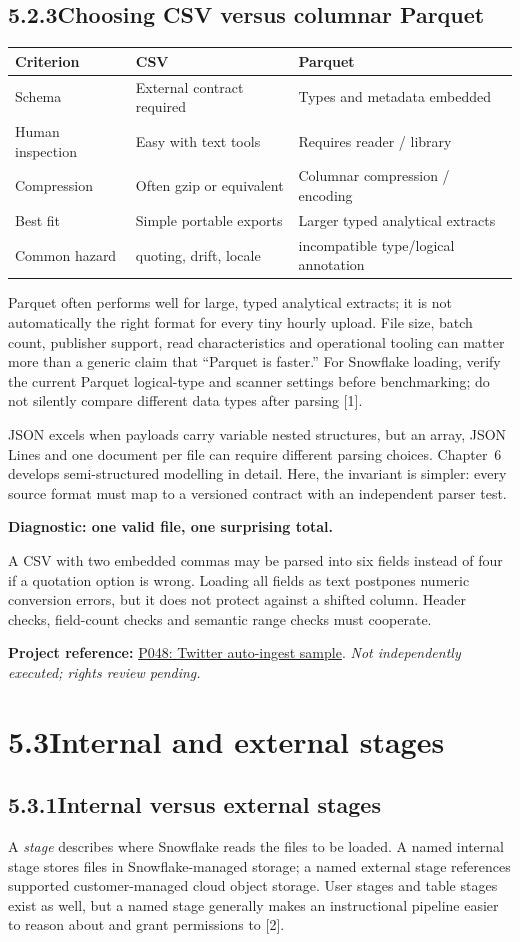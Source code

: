 \documentclass[11pt,twoside]{article}
\newcommand{\topic}[2]{\subsection*{#1\quad #2}}
\newcommand{\repo}[2]{\par\begingroup\fontsize{8.0}{9.6}\selectfont\sffamily\color{inkgray}\textbf{Project reference:} \href{#2}{#1}. \textit{Not independently executed; rights review pending.}\par\endgroup}
\begin{document}
\topic{5.2.3}{Choosing CSV versus columnar Parquet}
\begin{center}\small\begin{tabularx}{\linewidth}{@{}p{25mm}X X@{}}\toprule
Criterion & CSV & Parquet\\\midrule
Schema & External contract required & Types and metadata embedded\\
Human inspection & Easy with text tools & Requires reader / library\\
Compression & Often gzip or equivalent & Columnar compression / encoding\\
Best fit & Simple portable exports & Larger typed analytical extracts\\
Common hazard & quoting, drift, locale & incompatible type/logical annotation\\\bottomrule\end{tabularx}\end{center}
Parquet often performs well for large, typed analytical extracts; it is not automatically the right format for every tiny hourly upload. File size, batch count, publisher support, read characteristics and operational tooling can matter more than a generic claim that ``Parquet is faster.'' For Snowflake loading, verify the current Parquet logical-type and scanner settings before benchmarking; do not silently compare different data types after parsing [1].

JSON excels when payloads carry variable nested structures, but an array, JSON Lines and one document per file can require different parsing choices. Chapter~6 develops semi-structured modelling in detail. Here, the invariant is simpler: every source format must map to a versioned contract with an independent parser test.

\begin{insight}\textbf{Diagnostic: one valid file, one surprising total.}\par
A CSV with two embedded commas may be parsed into six fields instead of four if a quotation option is wrong. Loading all fields as text postpones numeric conversion errors, but it does not protect against a shifted column. Header checks, field-count checks and semantic range checks must cooperate.\end{insight}
\repo{P048: Twitter auto-ingest sample}{https://github.com/Snowflake-Labs/sfguide-twitter-auto-ingest}
\newpage
\section*{5.3\quad Internal and external stages}
\topic{5.3.1}{Internal versus external stages}
A \emph{stage} describes where Snowflake reads the files to be loaded. A named internal stage stores files in Snowflake-managed storage; a named external stage references supported customer-managed cloud object storage. User stages and table stages exist as well, but a named stage generally makes an instructional pipeline easier to reason about and grant permissions to [2].
\end{document}

